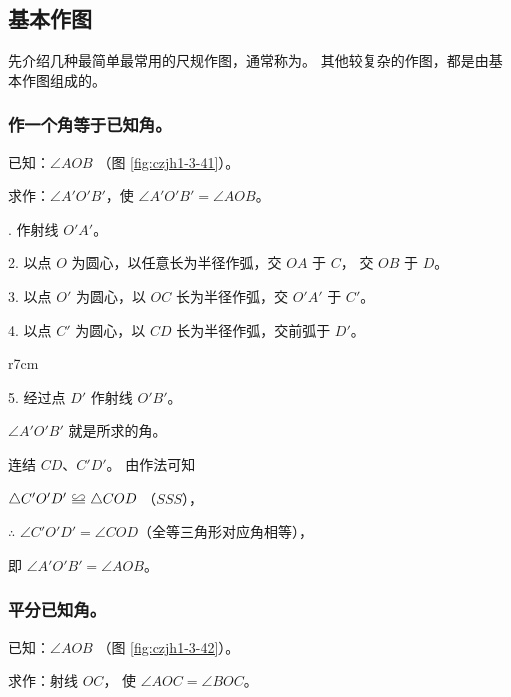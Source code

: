 \subsection{基本作图}\label{subsec:czjh1-3-11}

先介绍几种最简单最常用的尺规作图，通常称为。
其他较复杂的作图，都是由基本作图组成的。

\begingroup
{}

\begin{enhancedline}
\subsubsection{作一个角等于已知角。}

已知：$\angle AOB$ （图 \ref{fig:czjh1-3-41}）。

求作：$\angle A'O'B'$，使 $\angle A'O'B' = \angle AOB$。

. 作射线 $O'A'$。

2. 以点 $O$ 为圆心，以任意长为半径作弧，交 $OA$ 于 $C$， 交 $OB$ 于 $D$。

3. 以点 $O'$ 为圆心，以 $OC$ 长为半径作弧，交 $O'A'$ 于 $C'$。

4. 以点 $C'$ 为圆心，以 $CD$ 长为半径作弧，交前弧于 $D'$。

\begin{wrapfigure}[6]{r}{7cm}
    \centering
    
    \caption{}\label{fig:czjh1-3-41}
\end{wrapfigure}

5. 经过点 $D'$ 作射线 $O'B'$。

$\angle A'O'B'$ 就是所求的角。

\zhengming 连结 $CD$、$C'D'$。 由作法可知

\qquad $\triangle C'O'D' \quandeng \triangle COD$ （$SSS$），

$\therefore$ \quad $\angle C'O'D' = \angle COD$（全等三角形对应角相等），

即 \quad $\angle A'O'B' = \angle AOB$。


\subsubsection{平分已知角。}

已知：$\angle AOB$ （图 \ref{fig:czjh1-3-42}）。

求作：射线 $OC$， 使 $\angle AOC = \angle BOC$。


\end{enhancedline}

